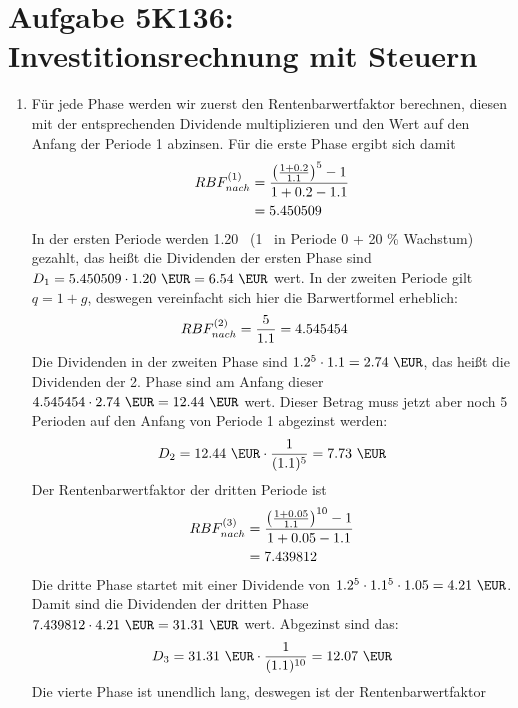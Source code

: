 \documentclass{article}
\begin{document}
	\section*{Aufgabe 5K136: Investitionsrechnung mit Steuern}
	\begin{enumerate}[label=(\alph*)]
		\item Für jede Phase werden wir zuerst den Rentenbarwertfaktor berechnen, diesen mit der entsprechenden Dividende multiplizieren und den Wert auf den Anfang der Periode 1 abzinsen. Für die erste Phase ergibt sich damit
		\begin{align}
			RBF_{nach}^{(1)} &= \frac{\left(\frac{1+0.2}{1.1}\right)^5-1}{1+0.2-1.1} \notag \\
			&= 5.450509 \notag
		\end{align}
		In der ersten Periode werden 1.20 \EUR\, (1 \EUR\, in Periode 0 + 20 \% Wachstum) gezahlt, das heißt die Dividenden der ersten Phase sind $D_1 = 5.450509\cdot 1.20\text{ \EUR} = 6.54 \text{ \EUR}$ wert. In der zweiten Periode gilt $q=1+g$, deswegen vereinfacht sich hier die Barwertformel erheblich:
		\begin{align}
			RBF_{nach}^{(2)} &= \frac{5}{1.1} = 4.545454 \notag
		\end{align}
		Die Dividenden in der zweiten Phase sind $1.2^5\cdot 1.1 = 2.74 \text{ \EUR}$, das heißt die Dividenden der 2. Phase sind am Anfang dieser $4.545454\cdot 2.74\text{ \EUR} = 12.44 \text{ \EUR}$ wert. Dieser Betrag muss jetzt aber noch 5 Perioden auf den Anfang von Periode 1 abgezinst werden:
		\begin{align}
			D_2 = 12.44\text{ \EUR}\cdot \frac{1}{(1.1)^5} = 7.73\text{ \EUR} \notag
		\end{align}
		Der Rentenbarwertfaktor der dritten Periode ist
		\begin{align}
			RBF_{nach}^{(3)} &= \frac{\left(\frac{1+0.05}{1.1}\right)^{10}-1}{1+0.05-1.1} \notag \\
			&= 7.439812 \notag
		\end{align}
		Die dritte Phase startet mit einer Dividende von $1.2^5\cdot 1.1^5\cdot 1.05 = 4.21\text{ \EUR}$. Damit sind die Dividenden der dritten Phase $7.439812\cdot 4.21\text{ \EUR} = 31.31\text{ \EUR}$ wert. Abgezinst sind das:
		\begin{align}
			D_3 = 31.31\text{ \EUR} \cdot\frac{1}{(1.1)^{10}} = 12.07\text{ \EUR} \notag
		\end{align}
		Die vierte Phase ist unendlich lang, deswegen ist der Rentenbarwertfaktor
		\begin{align}

\end{align}
\end{enumerate}
\end{document}
